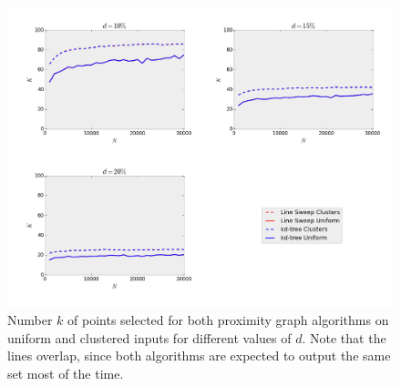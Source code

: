 \begin{figure}[!h] 
	\centering
	\includegraphics[width=\linewidth]{Pictures/ls_kd_k} 
	\caption[Number $k$ of points selected for Line Sweep and $k$-d Tree range search.]{Number $k$ of points selected for both proximity graph algorithms on uniform and clustered inputs for different values of $d$. Note that the lines overlap, since both algorithms are expected to output the same set most of the time.}
	\label{fig:ls_kd_k} 
\end{figure}